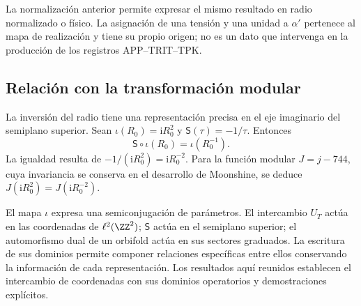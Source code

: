 La normalización anterior permite expresar el mismo resultado en
radio normalizado o físico. La asignación de una tensión y una
unidad a \(\alpha'\) pertenece al mapa de realización y tiene
su propio origen; no es un dato que intervenga en la producción
de los registros APP--TRIT--TPK.

\subsection{Relación con la transformación modular}

La inversión del radio tiene una representación precisa en el
eje imaginario del semiplano superior. Sean
\(\iota(R_0)=\mathrm iR_0^2\) y
\(\mathsf S(\tau)=-1/\tau\). Entonces
\begin{equation}
 \mathsf S\circ\iota(R_0)=\iota(R_0^{-1}).
 \label{iv:eq:semiconjugacion-modular}
\end{equation}
La igualdad resulta de
\(-1/(\mathrm iR_0^2)=\mathrm iR_0^{-2}\). Para la función
modular \(J=j-744\), cuya invariancia se conserva en el
desarrollo de Moonshine, se deduce
\(J(\mathrm iR_0^2)=J(\mathrm iR_0^{-2})\).

El mapa \(\iota\) expresa una semiconjugación de parámetros.
El intercambio \(U_T\) actúa en las coordenadas de
\(\ell^2(\ZZ^2)\); \(\mathsf S\) actúa en el semiplano
superior; el automorfismo dual de un orbifold actúa en sus
sectores graduados. La escritura de sus dominios permite
componer relaciones específicas entre ellos conservando la
información de cada representación. Los resultados aquí
reunidos establecen el intercambio de coordenadas con sus
dominios operatorios y demostraciones explícitos.
